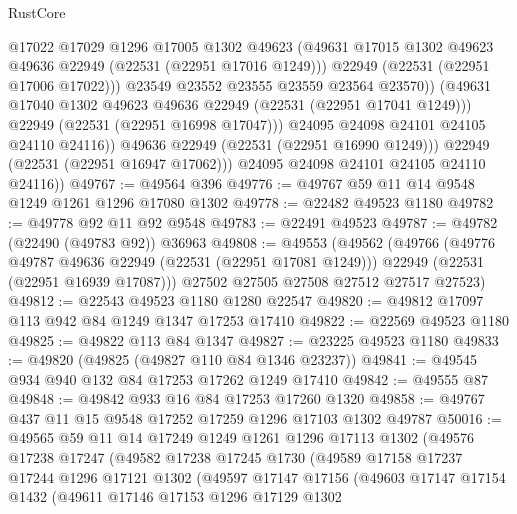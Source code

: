 \begin{lexlean}{RustCore}
\begin{coremodule}
                        @17022
                        @17029
                        @1296
                        @17005
                        @1302
                        @49623
                        (@49631 @17015 @1302 @49623 @49636 @22949 (@22531 (@22951 @17016 @1249)))
                        @22949
                        (@22531 (@22951 @17006 @17022)))
                      @23549
                      @23552
                      @23555
                      @23559
                      @23564
                      @23570))
                  (@49631 @17040 @1302 @49623 @49636 @22949 (@22531 (@22951 @17041 @1249)))
                  @22949
                  (@22531 (@22951 @16998 @17047)))
                @24095
                @24098
                @24101
                @24105
                @24110
                @24116))
            @49636
            @22949
            (@22531 (@22951 @16990 @1249)))
          @22949
          (@22531 (@22951 @16947 @17062)))
        @24095
        @24098
        @24101
        @24105
        @24110
        @24116))
@49767 := @49564 @396
@49776 := @49767 @59 @11 @14 @9548 @1249 @1261 @1296 @17080 @1302
@49778 := @22482 @49523 @1180
@49782 := @49778 @92 @11 @92 @9548
@49783 := @22491 @49523
@49787 := @49782 (@22490 (@49783 @92)) @36963
@49808 := @49553
    (@49562
      (@49766
        (@49776 @49787 @49636 @22949 (@22531 (@22951 @17081 @1249)))
        @22949
        (@22531 (@22951 @16939 @17087)))
      @27502
      @27505
      @27508
      @27512
      @27517
      @27523)
@49812 := @22543 @49523 @1180 @1280 @22547
@49820 := @49812 @17097 @113 @942 @84 @1249 @1347 @17253 @17410
@49822 := @22569 @49523 @1180
@49825 := @49822 @113 @84 @1347
@49827 := @23225 @49523 @1180
@49833 := @49820 (@49825 (@49827 @110 @84 @1346 @23237))
@49841 := @49545 @934 @940 @132 @84 @17253 @17262 @1249 @17410
@49842 := @49555 @87
@49848 := @49842 @933 @16 @84 @17253 @17260 @1320
@49858 := @49767 @437 @11 @15 @9548 @17252 @17259 @1296 @17103 @1302 @49787
@50016 := @49565
    @59
    @11
    @14
    @17249
    @1249
    @1261
    @1296
    @17113
    @1302
    (@49576
      @17238
      @17247
      (@49582
        @17238
        @17245
        @1730
        (@49589
          @17158
          @17237
          @17244
          @1296
          @17121
          @1302
          (@49597
            @17147
            @17156
            (@49603
              @17147
              @17154
              @1432
              (@49611
                @17146
                @17153
                @1296
                @17129
                @1302

\end{coremodule}
\end{lexlean}
